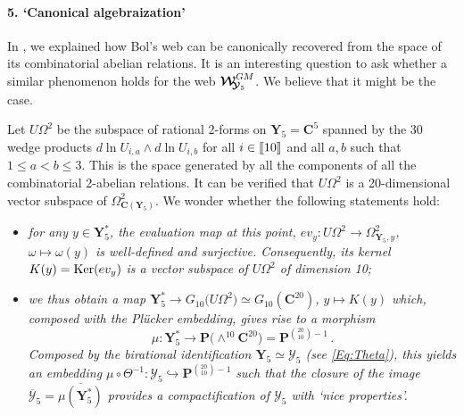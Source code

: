 \documentclass[11pt]{amsart}
\newcommand{\sk}{\smallskip}
\begin{document}
\paragraph{\bf 5. `Canonical algebraization'}%
In \cite[\S3.5]{PirioAFST}, we explained how Bol's web can be canonically recovered from the space of its combinatorial abelian relations. It is an interesting question to ask whether a similar phenomenon holds for the web $\boldsymbol{\mathcal W}_{\hspace{-0.1cm} \boldsymbol{\mathcal Y}_5}^{GM}$. We believe that it might be the case. 

Let $U\Omega^2$ be the subspace 
of rational 2-forms on $\boldsymbol{Y}_5=\mathbf C^5$ spanned by the  30 wedge products $d\ln U_{i,a}\wedge d\ln U_{i,b}$ for all $i\in [\hspace{-0.05cm}[ 10 ]\hspace{-0.05cm}]$ and all $a,b$ such that $1\leq a<b\leq 3$. 
This is the space generated by all the components of all the combinatorial 2-abelian relations. It can be verified that $U\Omega^2$
  is a 20-dimensional vector subspace of  
 $\Omega^2_{\mathbf C( \boldsymbol{Y}_5)}$. We wonder whether the following statements hold:
\begin{itemize}
\item  {\it for any $y\in 
\boldsymbol{Y}_5^*$,  the evaluation map at this point,  $ev_y : U\Omega^2\rightarrow \Omega^2_{\boldsymbol{Y}_5,y}$, $\omega\mapsto \omega(y)$  is well-defined and surjective. Consequently, its kernel $K(y)={\rm Ker}(ev_y)$ is a vector subspace of $U\Omega^2$ of dimension 10;}
\sk 
\item   {\it we thus obtain a map $\boldsymbol{Y}_5^*\rightarrow G_{10}\big( 
U\Omega^2\big)\simeq G_{10}(\mathbf C^{20})$, $y\longmapsto K(y)$ which, composed with the Pl\"ucker embedding, gives rise to a morphism 
$$\mu : \boldsymbol{Y}_5^* \longrightarrow \mathbf P\Big(\wedge^{10} \mathbf C^{20}\Big)=\mathbf P^{ { 20 \choose 10}-1}\, .$$ 
Composed by the birational identification  $\boldsymbol{Y}_5\simeq \boldsymbol{\mathcal Y}_5$ (see \eqref{Eq:Theta}), this yields an embedding $\mu\circ \Theta^{-1}: \boldsymbol{\mathcal Y}_5 \hookrightarrow \mathbf P^{ { 20 \choose 10}-1}$ such that 
the closure of the image $\overline{\boldsymbol{\mathcal Y}}_5 = \overline{\mu(\boldsymbol{Y}_5^*)}$ 
provides a compactification of $\boldsymbol{\mathcal Y}_5$ with `nice properties'.}
\end{itemize}
\end{document}
